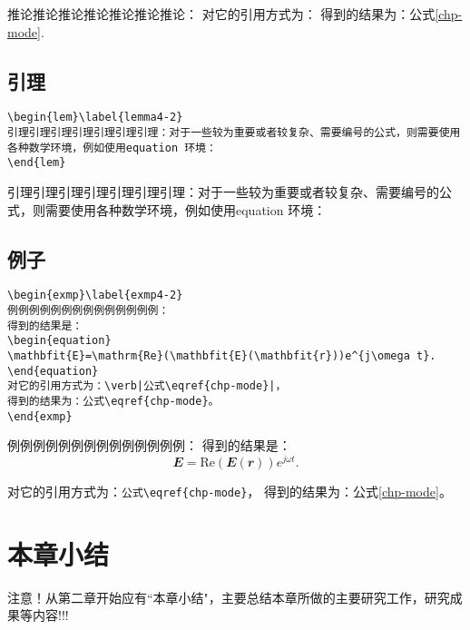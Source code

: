 \begin{cor}\label{cor4-2}
推论推论推论推论推论推论推论：
对它的引用方式为：
得到的结果为：公式\eqref{chp-mode}.
\end{cor}

\subsection{引理}\label{lem}
\begin{verbatim}
\begin{lem}\label{lemma4-2}
引理引理引理引理引理引理引理：对于一些较为重要或者较复杂、需要编号的公式，则需要使用各种数学环境，例如使用equation 环境：
\end{lem}
\end{verbatim}
\begin{lem}\label{lemma4-2}
引理引理引理引理引理引理引理：对于一些较为重要或者较复杂、需要编号的公式，则需要使用各种数学环境，例如使用equation 环境：
\end{lem}

\subsection{例子}\label{exmp}
\begin{verbatim}
\begin{exmp}\label{exmp4-2}
例例例例例例例例例例例例例例：
得到的结果是：
\begin{equation}
\mathbfit{E}=\mathrm{Re}(\mathbfit{E}(\mathbfit{r}))e^{j\omega t}.
\end{equation}
对它的引用方式为：\verb|公式\eqref{chp-mode}|，
得到的结果为：公式\eqref{chp-mode}。
\end{exmp}
\end{verbatim}
\begin{exmp}\label{exmp4-2}
例例例例例例例例例例例例例例：
得到的结果是：
\begin{equation}
\mathbfit{E}=\mathrm{Re}(\mathbfit{E}(\mathbfit{r}))e^{j\omega t}.
\end{equation}

对它的引用方式为：\verb|公式\eqref{chp-mode}|，
得到的结果为：公式\eqref{chp-mode}。
\end{exmp}

\section{本章小结}\label{section4-10}
注意！从第二章开始应有``本章小结"，主要总结本章所做的主要研究工作，研究成果等内容!!!

